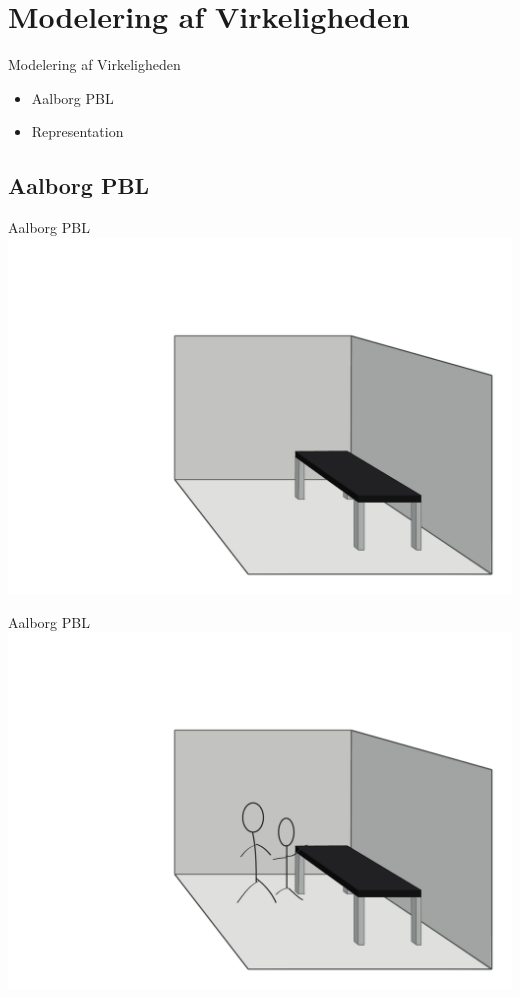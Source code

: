 \newcommand{\modelreality}{Modelering af Virkeligheden}
\newcommand{\topicone}{Aalborg PBL}
\newcommand{\topictwo}{Representation}
\section*{\modelreality}

\begin{frame}{\modelreality}
\begin{itemize}
	\item \topicone
	\item \topictwo
\end{itemize}
\end{frame}

\subsection*{\topicone}

\begin{frame}{\topicone} 
\includegraphics[width=\columnwidth]{input/rasmus/Rasmus1.pdf}
\end{frame}

\begin{frame}{\topicone} 
\includegraphics[width=\columnwidth]{input/rasmus/Rasmus2.pdf}
\end{frame}

